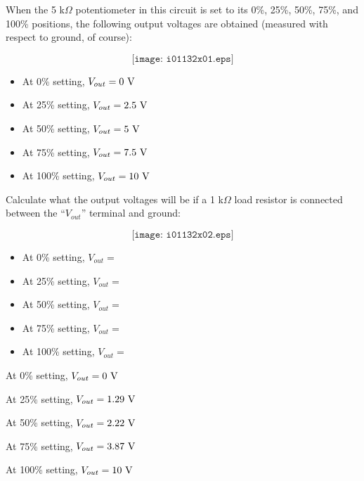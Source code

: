 

When the 5 k$\Omega$ potentiometer in this circuit is set to its 0\%, 25\%, 50\%, 75\%, and 100\% positions, the following output voltages are obtained (measured with respect to ground, of course):

$$\texttt{[image: i01132x01.eps]}$$

\begin{itemize}
\item{} At 0\% setting, $V_{out} = 0 \hbox{ V}$
\item{} At 25\% setting, $V_{out} = 2.5 \hbox{ V}$
\item{} At 50\% setting, $V_{out} = 5 \hbox{ V}$
\item{} At 75\% setting, $V_{out} = 7.5 \hbox{ V}$
\item{} At 100\% setting, $V_{out} = 10 \hbox{ V}$
\end{itemize}

Calculate what the output voltages will be if a 1 k$\Omega$ load resistor is connected between the ``$V_{out}$'' terminal and ground:

$$\texttt{[image: i01132x02.eps]}$$

\begin{itemize}
\item{} At 0\% setting, $V_{out} = $
\item{} At 25\% setting, $V_{out} = $
\item{} At 50\% setting, $V_{out} = $
\item{} At 75\% setting, $V_{out} = $
\item{} At 100\% setting, $V_{out} = $
\end{itemize}







\item{} At 0\% setting, $V_{out} = 0 \hbox{ V}$
\item{} At 25\% setting, $V_{out} = 1.29 \hbox{ V}$
\item{} At 50\% setting, $V_{out} = 2.22 \hbox{ V}$
\item{} At 75\% setting, $V_{out} = 3.87 \hbox{ V}$
\item{} At 100\% setting, $V_{out} = 10 \hbox{ V}$

